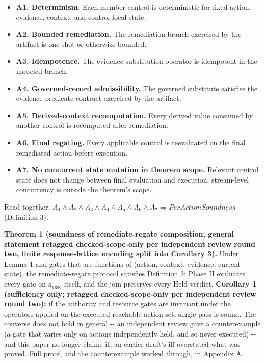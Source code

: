 \documentclass[11pt,a4paper]{article}
\theoremstyle{definition}
\begin{document}
\begin{itemize}
\item \textbf{A1. Determinism.} Each member control is deterministic for fixed action, evidence, context, and control-local state.
\item \textbf{A2. Bounded remediation.} The remediation branch exercised by the artifact is one-shot or otherwise bounded.
\item \textbf{A3. Idempotence.} The evidence substitution operator is idempotent in the modeled branch.
\item \textbf{A4. Governed-record admissibility.} The governed substitute satisfies the evidence-predicate contract exercised by the artifact.
\item \textbf{A5. Derived-context recomputation.} Every derived value consumed by another control is recomputed after remediation.
\item \textbf{A6. Final regating.} Every applicable control is reevaluated on the final remediated action before execution.
\item \textbf{A7. No concurrent state mutation in theorem scope.} Relevant control state does not change between final evaluation and execution; stream-level concurrency is outside the theorem's scope.
\end{itemize}

\noindent Read together: $A_1 \land A_2 \land A_3 \land A_4 \land A_5 \land A_6 \land A_7 \Rightarrow \mathit{PerActionSoundness}$ (Definition 3).

\noindent\textbf{Theorem 1 (soundness of remediate-regate composition; general statement retagged checked-scope-only per independent review round two, finite response-lattice encoding split into Corollary 3).} Under Lemma 1 and gates that are functions of (action, context, evidence, current state), the remediate-regate protocol satisfies Definition 3: Phase II evaluates every gate on $a_{\mathrm{exec}}$ itself, and the join preserves every Held verdict. \textbf{Corollary 1 (sufficiency only; retagged checked-scope-only per independent review round two):} if the authority and resource gates are invariant under the operators applied on the executed-reachable action set, single-pass is sound. The converse does not hold in general -{}- an independent review gave a counterexample (a gate that varies only on actions independently held, and so never executed) -{}- and this paper no longer claims it; an earlier draft's iff overstated what was proved. Full proof, and the counterexample worked through, in Appendix A.
\end{document}
